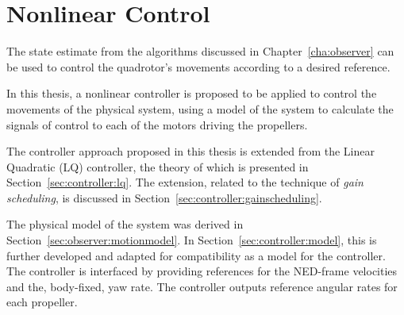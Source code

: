 \chapter{Nonlinear Control}
\label{cha:controller}
    The state estimate from the algorithms discussed in Chapter~\ref{cha:observer}
    can be used to control the quadrotor's movements according to a desired
    reference.

    In this thesis, a nonlinear controller is proposed to be applied to
    control the movements of the physical system, using a model
    of the system to calculate the signals of control to each
    of the motors driving the propellers.

    The controller approach proposed in this thesis is extended from the Linear Quadratic (LQ)
    controller, the theory of which is presented in Section~\ref{sec:controller:lq}.
    The extension, related to the technique of \textit{gain scheduling}, is discussed
    in Section~\ref{sec:controller:gainscheduling}.

    The physical model of the system was derived in Section~\ref{sec:observer:motionmodel}.
    In Section~\ref{sec:controller:model}, this is further developed
    and adapted for compatibility as a model for the controller.
    The controller is interfaced by providing references
    for the NED-frame velocities and the, body-fixed, yaw rate.
    The controller outputs reference angular rates for each propeller.

    
    
    
